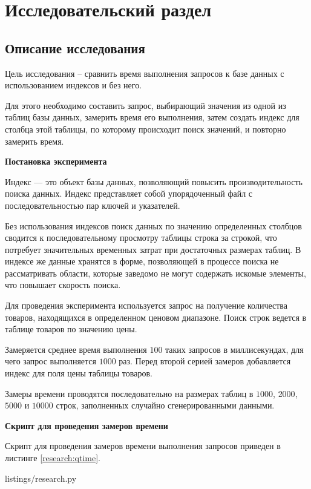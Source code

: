 \section{Исследовательский раздел}

\subsection{Описание исследования}

Цель исследования -- сравнить время выполнения запросов к базе данных с использованием индексов и без него.

Для этого необходимо составить запрос, выбирающий значения из одной из таблиц базы данных, замерить время его выполнения, затем создать индекс для столбца этой таблицы, по которому происходит поиск значений, и повторно замерить время.

\textbf{Постановка эксперимента}

Индекс — это объект базы данных, позволяющий повысить производительность поиска данных. Индекс представляет собой упорядоченный файл с последовательностью пар ключей и указателей.

Без использования индексов поиск данных по значению определенных столбцов сводится к последовательному просмотру таблицы строка за строкой, что потребует значительных временных затрат при достаточных размерах таблиц. В индексе же данные хранятся в форме, позволяющей в процессе поиска не рассматривать области, которые заведомо не могут содержать искомые элементы, что повышает скорость поиска.

Для проведения эксперимента используется запрос на получение количества товаров, находящихся в определенном ценовом диапазоне. Поиск строк ведется в таблице товаров по значению цены.

Замеряется среднее время выполнения $100$ таких запросов в миллисекундах, для чего запрос выполняется $1000$ раз. Перед второй серией замеров добавляется индекс для поля цены таблицы товаров.

Замеры времени проводятся последовательно на размерах таблиц в $1000$, $2000$, $5000$ и $10000$ строк, заполненных случайно сгенерированными данными.

\pagebreak

\textbf{Скрипт для проведения замеров времени}

Скрипт для проведения замеров времени выполнения запросов приведен в листинге \ref{research:qtime}.


{listings/research.py}

